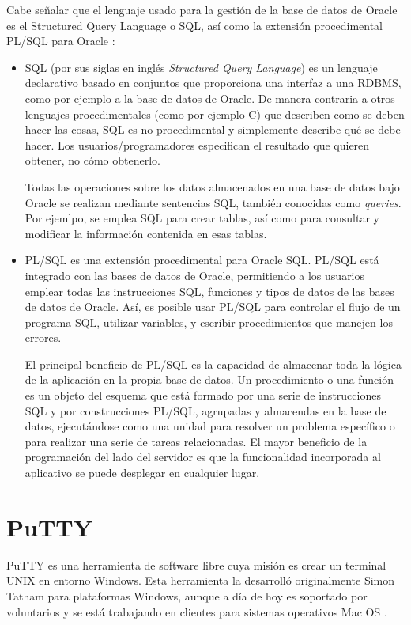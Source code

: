 \documentclass[a4paper, 12pt]{book}
\begin{document}
Cabe señalar que el lenguaje usado para la gestión de la base de datos de Oracle es el Structured Query Language o SQL, así como la extensión procedimental PL/SQL para Oracle \cite{oracle02}:
\begin{itemize}
	\item SQL (por sus siglas en inglés \textit{Structured Query Language}) es un lenguaje declarativo basado en conjuntos que proporciona una interfaz a una RDBMS, como por ejemplo a la base de datos de Oracle. De manera contraria a otros lenguajes procedimentales (como por ejemplo C) que describen como se deben hacer las cosas, SQL es no-procedimental y simplemente describe qué se debe hacer. Los usuarios/programadores especifican el resultado que quieren obtener, no cómo obtenerlo.
	
Todas las operaciones sobre los datos almacenados en una base de datos bajo Oracle se realizan mediante sentencias SQL, también conocidas como \textit{queries}. Por ejemlpo, se emplea SQL para crear tablas, así como para consultar y modificar la información contenida en esas tablas.
	\item PL/SQL es una extensión procedimental para Oracle SQL. PL/SQL está integrado con las bases de datos de Oracle, permitiendo a los usuarios emplear todas las instrucciones SQL, funciones y tipos de datos de las bases de datos de Oracle. Así, es posible usar PL/SQL para controlar el flujo de un programa SQL, utilizar variables, y escribir procedimientos que manejen los errores.
	
El principal beneficio de PL/SQL es la capacidad de almacenar toda la lógica de la aplicación en la propia base de datos. Un procedimiento o una función es un objeto del esquema que está formado por una serie de instrucciones SQL y por construcciones PL/SQL, agrupadas y almacendas en la base de datos, ejecutándose como una unidad para resolver un problema específico o para realizar una serie de tareas relacionadas. El mayor beneficio de la programación del lado del servidor es que la funcionalidad incorporada al aplicativo se puede desplegar en cualquier lugar.
\end{itemize}

\section{PuTTY}
\label{sec:PuTTY}
PuTTY es una herramienta de software libre cuya misión es crear un terminal UNIX en entorno Windows. Esta herramienta la desarrolló originalmente Simon Tatham para plataformas Windows, aunque a día de hoy es soportado por voluntarios y se está trabajando en clientes para sistemas operativos Mac OS \cite{putty1,putty2,putty3}.
\end{document}

